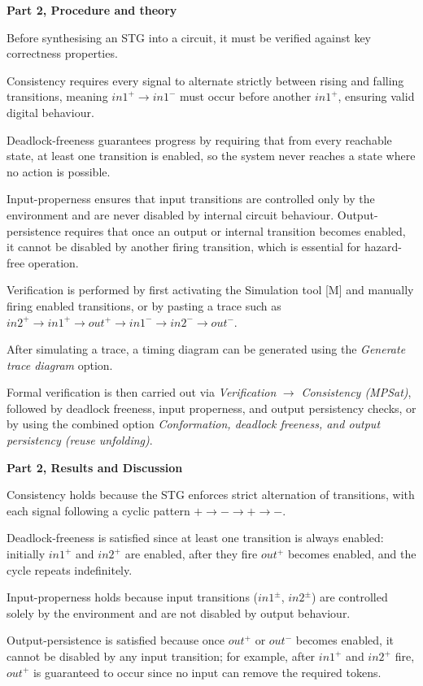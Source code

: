 \documentclass[a4paper,12pt]{article}
\begin{document}
\textbf{Part 2, Procedure and theory}

Before synthesising an STG into a circuit, it must be verified against key correctness properties. 

Consistency requires every signal to alternate strictly between rising and falling transitions, meaning $in1^+ \rightarrow in1^-$ must occur before another $in1^+$, ensuring valid digital behaviour. 

Deadlock-freeness guarantees progress by requiring that from every reachable state, at least one transition is enabled, so the system never reaches a state where no action is possible. 

Input-properness ensures that input transitions are controlled only by the environment and are never disabled by internal circuit behaviour. Output-persistence requires that once an output or internal transition becomes enabled, it cannot be disabled by another firing transition, which is essential for hazard-free operation.

Verification is performed by first activating the Simulation tool [M] and manually firing enabled transitions, or by pasting a trace such as $in2^+ \rightarrow in1^+ \rightarrow out^+ \rightarrow in1^- \rightarrow in2^- \rightarrow out^-$. 

After simulating a trace, a timing diagram can be generated using the \textit{Generate trace diagram} option. 

Formal verification is then carried out via \textit{Verification} $\rightarrow$ \textit{Consistency (MPSat)}, followed by deadlock freeness, input properness, and output persistency checks, or by using the combined option \textit{Conformation, deadlock freeness, and output persistency (reuse unfolding)}.

\textbf{Part 2, Results and Discussion}

Consistency holds because the STG enforces strict alternation of transitions, with each signal following a cyclic pattern $+ \rightarrow - \rightarrow + \rightarrow -$. 

Deadlock-freeness is satisfied since at least one transition is always enabled: initially $in1^+$ and $in2^+$ are enabled, after they fire $out^+$ becomes enabled, and the cycle repeats indefinitely. 

Input-properness holds because input transitions ($in1^\pm$, $in2^\pm$) are controlled solely by the environment and are not disabled by output behaviour. 

Output-persistence is satisfied because once $out^+$ or $out^-$ becomes enabled, it cannot be disabled by any input transition; for example, after $in1^+$ and $in2^+$ fire, $out^+$ is guaranteed to occur since no input can remove the required tokens.
\end{document}
